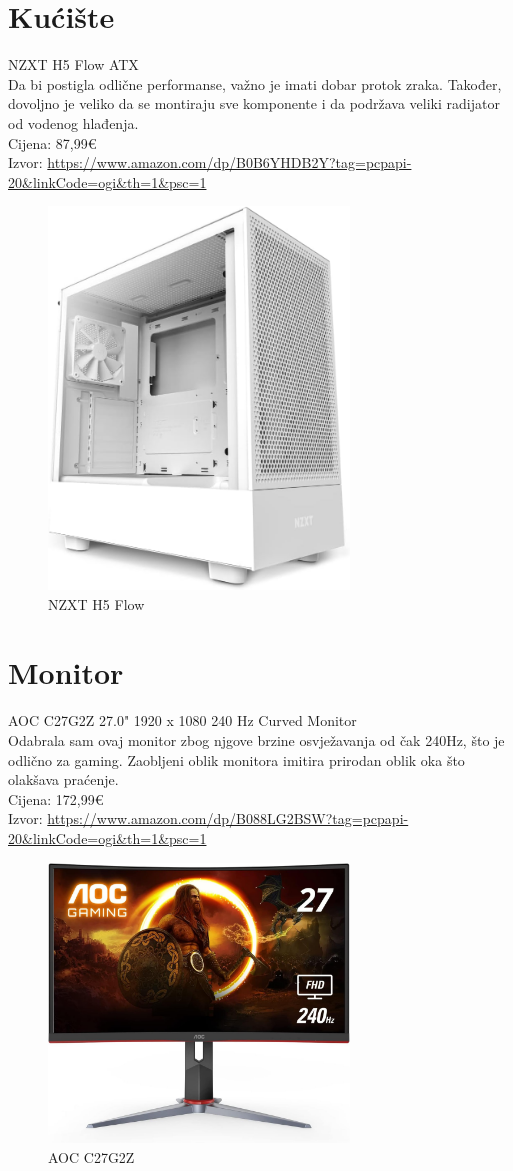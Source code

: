 \documentclass{report}
\begin{document}
\chapter{Kućište}
NZXT H5 Flow ATX
\\ Da bi postigla odlične performanse, važno je imati dobar protok zraka. Također, dovoljno je veliko da se montiraju sve komponente i da podržava veliki radijator od vodenog hlađenja.
\\Cijena: 87,99€
\\Izvor:  \url{https://www.amazon.com/dp/B0B6YHDB2Y?tag=pcpapi-20&linkCode=ogi&th=1&psc=1}
\begin{figure}[h]
\includegraphics[width=8cm]{kuciste.jpg}
\caption{NZXT H5 Flow}
\end{figure}

\chapter{Monitor}
AOC C27G2Z 27.0" 1920 x 1080 240 Hz Curved Monitor
\\Odabrala sam ovaj monitor zbog njgove brzine osvježavanja od čak 240Hz, što je odlično za gaming. Zaobljeni oblik monitora imitira prirodan oblik oka što olakšava praćenje.
\\Cijena: 172,99€
\\Izvor:  \url{https://www.amazon.com/dp/B088LG2BSW?tag=pcpapi-20&linkCode=ogi&th=1&psc=1}
\begin{figure}[h]
\includegraphics[width=8cm]{monitor.jpg}
\caption{AOC C27G2Z}
\end{figure}
\end{document}
